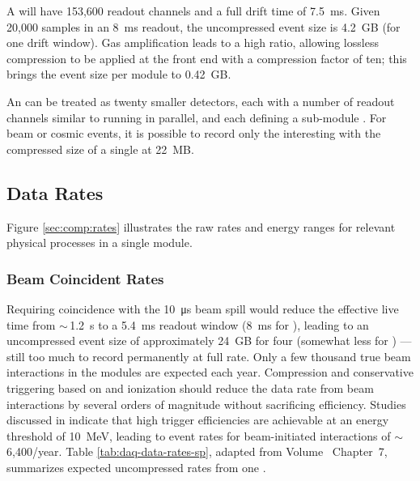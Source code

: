 A  will have 153,600 readout channels and a full drift time of \SI{7.5}{ms}. Given 20,000 samples in an \SI{8}{ms} readout, the uncompressed event size is \SI{4.2}{GB} (for one drift window).  Gas amplification leads to a high  ratio, allowing lossless compression to be applied at the front end  with a compression factor of ten; this brings the event size per module to \SI{.42}{GB}.

An    can be treated as twenty smaller  detectors, each with a number of readout channels similar to   
running in parallel,  and each defining a sub-module . For beam or cosmic events, it is possible to record only the interesting  with the compressed size of a single  at \SI{22}{MB}.

\subsection{Data Rates}
\label{sec:exec-comp-dt-dr}

Figure \ref{sec:comp:rates} illustrates the raw rates and energy ranges for relevant physical processes in a single   module. 


\subsubsection{Beam Coincident Rates}
\label{sec:exec-comp-dt-bcr}


 Requiring  coincidence with the \SI{10}{\micro\second}  beam spill would reduce the effective live time from $\sim\,$\SI{1.2}{s} to a \SI{5.4}{ms} readout window (\SI{8}{ms} for ), leading to an uncompressed event size of approximately \SI{24}{GB} for four  (somewhat less for ) --- still too much to record permanently at full rate. 
Only a few thousand true beam interactions in the  modules are expected each year.  Compression and conservative triggering based on  and ionization should reduce the data rate from beam interactions by several orders of magnitude without sacrificing efficiency.  Studies discussed in  \spchdaq{} indicate that high trigger efficiencies are achievable at an energy threshold of \SI{10}{MeV}, leading to event rates for beam-initiated  interactions of $\sim\,$6,400/year.
Table \ref{tab:daq-data-rates-sp}, adapted from Volume~\volnumbersp{} Chapter~7, 
 summarizes expected uncompressed rates from one . 

